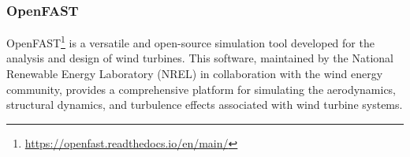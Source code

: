 \subsubsection{OpenFAST}

OpenFAST\footnote{\url{https://openfast.readthedocs.io/en/main/}} is a versatile and open-source simulation tool developed for the analysis and design of wind turbines. This software, maintained by the National Renewable Energy Laboratory (NREL) in collaboration with the wind energy community, provides a comprehensive platform for simulating the aerodynamics, structural dynamics, and turbulence effects associated with wind turbine systems.

